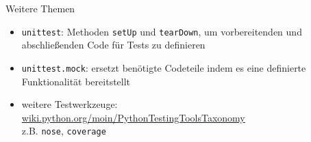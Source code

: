 \documentclass[t, utf8x, 10pt]{beamer}
\begin{document}
\begin{frame}{Weitere Themen}
 \begin{itemize}
  \item \texttt{unittest}: Methoden \texttt{setUp} und \texttt{tearDown}, um
	vorbereitenden und abschließenden Code für Tests zu definieren
  \item \texttt{unittest.mock}: ersetzt benötigte Codeteile indem es eine
	definierte Funktionalität bereitstellt
  \item weitere Testwerkzeuge:\\
	\url{wiki.python.org/moin/PythonTestingToolsTaxonomy}\\
	z.B. \texttt{nose}, \texttt{coverage}
 \end{itemize}
\end{frame}
\end{document}
